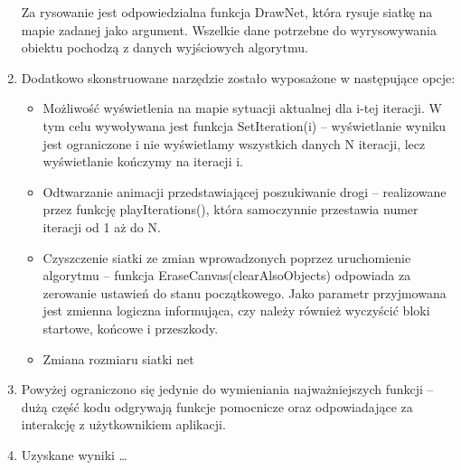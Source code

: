 \documentclass{article}
\begin{document}
\begin{enumerate}
Za rysowanie jest odpowiedzialna funkcja DrawNet, która rysuje siatkę na mapie zadanej jako argument. Wszelkie dane potrzebne do wyrysowywania obiektu pochodzą z danych wyjściowych algorytmu. 
	\item Dodatkowo skonstruowane narzędzie zostało wyposażone w następujące opcje:
	\begin{itemize}
			\item Możliwość wyświetlenia na mapie sytuacji aktualnej dla i-tej iteracji. W tym celu wywoływana jest funkcja SetIteration(i) – wyświetlanie wyniku jest ograniczone i nie wyświetlamy wszystkich danych N iteracji, lecz wyświetlanie kończymy na iteracji i.
   			\item Odtwarzanie animacji przedstawiającej poszukiwanie drogi – realizowane przez funkcję playIterations(), która samoczynnie przestawia numer iteracji od 1 aż do N.
			\item Czyszczenie siatki ze zmian wprowadzonych poprzez uruchomienie algorytmu – funkcja EraseCanvas(clearAlsoObjects) odpowiada za zerowanie ustawień do stanu początkowego. Jako parametr przyjmowana jest zmienna logiczna informująca, czy należy również wyczyścić bloki startowe, końcowe i przeszkody. 
			\item Zmiana rozmiaru siatki net
	\end{itemize}
	\item Powyżej ograniczono się jedynie do wymieniania najważniejszych funkcji – dużą część kodu odgrywają funkcje pomocnicze oraz odpowiadające za interakcję z użytkownikiem aplikacji. 
	\item Uzyskane wyniki …
\end{enumerate}
\end{document}
